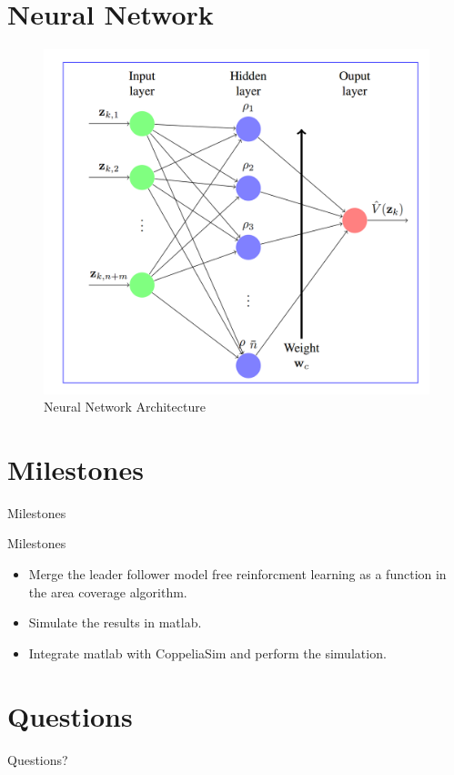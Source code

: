 \documentclass{beamer}
\begin{document}
\section{Neural Network}
\begin{frame}
\begin{figure}
\includegraphics[scale=0.2]{figs/img/criticNeuralNetwork.png}
\caption{Neural Network Architecture}
\end{figure}
\end{frame}
\section{Milestones}
\begin{frame}{Milestones}
\begin{block}{Milestones}
\begin{itemize}
\item Merge the leader follower model free reinforcment learning as a function in the area coverage algorithm.
\item Simulate the results in matlab.
\item Integrate matlab with CoppeliaSim and perform the simulation.  
\end{itemize}
\end{block}
\end{frame}
\section*{Questions}
\begin{frame}
\begin{LARGE}
\begin{center}
Questions?
\end{center}
\end{LARGE}
\end{frame}
\end{document}
